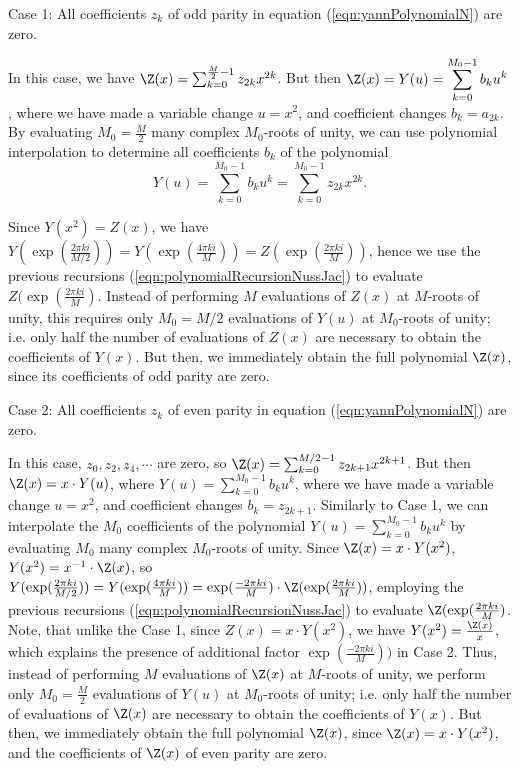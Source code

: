 \noindent
{\sc Case 1}: All coefficients $z_k$ of odd parity in
equation (\ref{eqn:yannPolynomialN}) are zero.
\smallskip

\noindent
In this case, we have
$\Z(x) = \sum_{k=0}^{\frac{M}{2}-1} z_{2k} x^{2k}$. But then
$\Z(x) = Y(u) = \displaystyle\sum_{k=0}^{M_0-1} b_k u^k$,
where we have made a variable change $u=x^2$, and coefficient changes
$b_k = a_{2k}$.
By evaluating $M_0=\frac{M}{2}$ many complex
$M_0$-roots of unity, we can
use polynomial interpolation to determine all coefficients $b_k$ of
the polynomial
\[
Y(u) = \displaystyle\sum_{k=0}^{M_0-1} b_k u^k =
\displaystyle\sum_{k=0}^{M_0-1} z_{2k} x^{2k}.
\]


Since $Y(x^2)=Z(x)$, we have
$Y(\exp(\frac{2\pi k i}{M/2})) =
Y(\exp(\frac{4\pi k i}{M})) =
Z(\exp(\frac{2\pi k i}{M}))$, hence we
use the previous recursions (\ref{eqn:polynomialRecursionNussJac})
to evaluate $Z(\exp(\frac{2\pi ki}{M})$.  Instead of
performing $M$ evaluations of $Z(x)$ at $M$-roots of unity,
this requires only $M_0=M/2$ evaluations of $Y(u)$ at
$M_0$-roots of unity; i.e. only half the number of
evaluations of $Z(x)$ are necessary to
obtain the coefficients of $Y(x)$. But then, we immediately obtain the
full polynomial $\Z(x)$, since its coefficients of odd  parity are zero.
\medskip

\noindent
{\sc Case 2}: All coefficients $z_k$ of even parity in
equation (\ref{eqn:yannPolynomialN}) are zero.
\smallskip

\noindent
In this case, $z_0,z_2,z_4,\cdots$ are zero, so
$\Z(x) = \sum_{k=0}^{M/2-1} z_{2k+1} x^{2k+1}$. But then
$\Z(x) = x \cdot Y(u)$, where
$Y(u)= \sum_{k=0}^{M_0-1} b_k u^k$, where we have made
a variable change $u=x^2$, and coefficient changes
$b_k = z_{2k+1}$. Similarly to Case 1,
we can interpolate the $M_0$ coefficients of the polynomial
$Y(u) = \displaystyle\sum_{k=0}^{M_0-1} b_k u^k$
by evaluating $M_0$ many complex $M_0$-roots
of unity.  Since $\Z(x)=x \cdot Y(x^2)$, $Y(x^2) = x^{-1} \cdot \Z(x)$,
so
$Y(\exp(\frac{2\pi ki}{M/2})) = Y(\exp(\frac{4\pi ki}{M})) =
\exp(\frac{-2\pi ki}{M}) \cdot
\Z(\exp(\frac{2\pi ki}{M}))$, employing
the previous recursions (\ref{eqn:polynomialRecursionNussJac})
to evaluate $\Z(\exp(\frac{2\pi ki}{M})$.  Note, that unlike the
Case 1, since $Z(x)=x \cdot Y(x^2)$, we have
$Y(x^2)=\frac{\Z(x)}{x}$, which explains the presence of additional factor
$\exp(\frac{-2\pi ki}{M}))$ in Case 2.  Thus, instead of
performing $M$ evaluations of $\Z(x)$ at $M$-roots of unity,
we perform only $M_0=\frac{M}{2}$ evaluations of $Y(u)$ at
$M_0$-roots of unity; i.e. only half the number of
evaluations of $\Z(x)$ are necessary to
obtain the coefficients of $Y(x)$. But then, we immediately obtain the
full polynomial $\Z(x)$, since $\Z(x) = x \cdot Y(x^2)$, and the
coefficients of $\Z(x)$ of even parity are zero.

